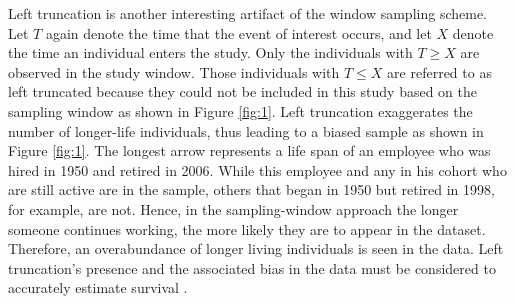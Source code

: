 Left truncation is another interesting artifact of the window sampling scheme. Let $T$ again denote the time that the event of interest occurs, and let $X$ denote the time an individual enters the study. Only the individuals with $T \geq X$ are observed in the study window. Those individuals with $T \leq X$ are referred to as left truncated because they could not be included in this study based on the sampling window as shown in Figure \ref{fig:1}. Left truncation exaggerates the number of longer-life individuals, thus leading to a biased sample as shown in Figure \ref{fig:1}. The longest arrow represents a life span of an employee who was hired in 1950 and retired in 2006. While this employee and any in his cohort who are still active are in the sample, others that began in 1950 but retired in 1998, for example, are not. Hence, in the sampling-window approach the longer someone continues working, the more likely they are to appear in the dataset. Therefore, an overabundance of longer living individuals is seen in the data. Left truncation's presence and the associated bias in the data must be considered to accurately estimate survival \citep{carrion2010}.

